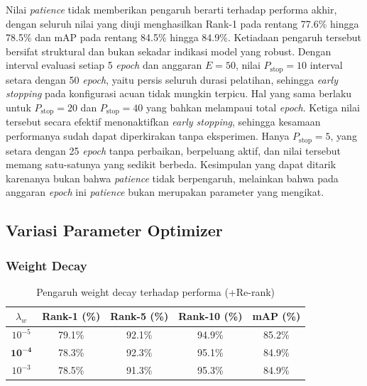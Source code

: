 Nilai \textit{patience} tidak memberikan pengaruh berarti terhadap performa akhir, dengan seluruh nilai yang diuji menghasilkan Rank-1 pada rentang 77.6\% hingga 78.5\% dan mAP pada rentang 84.5\% hingga 84.9\%. Ketiadaan pengaruh tersebut bersifat struktural dan bukan sekadar indikasi model yang robust. Dengan interval evaluasi setiap 5 \textit{epoch} dan anggaran $E=50$, nilai $P_{\text{stop}}=10$ interval setara dengan 50 \textit{epoch}, yaitu persis seluruh durasi pelatihan, sehingga \textit{early stopping} pada konfigurasi acuan tidak mungkin terpicu. Hal yang sama berlaku untuk $P_{\text{stop}}=20$ dan $P_{\text{stop}}=40$ yang bahkan melampaui total \textit{epoch}. Ketiga nilai tersebut secara efektif menonaktifkan \textit{early stopping}, sehingga kesamaan performanya sudah dapat diperkirakan tanpa eksperimen. Hanya $P_{\text{stop}}=5$, yang setara dengan 25 \textit{epoch} tanpa perbaikan, berpeluang aktif, dan nilai tersebut memang satu-satunya yang sedikit berbeda. Kesimpulan yang dapat ditarik karenanya bukan bahwa \textit{patience} tidak berpengaruh, melainkan bahwa pada anggaran \textit{epoch} ini \textit{patience} bukan merupakan parameter yang mengikat.

\subsection{Variasi Parameter Optimizer}

\subsubsection{Weight Decay}

\begin{table}[H]
    \centering
    \caption{Pengaruh weight decay terhadap performa (+Re-rank)}
    \label{tab:var_wd}
    \renewcommand{\arraystretch}{1.25}
    \begin{tabular}{ccccc}
        \hline
        $\lambda_w$        & \textbf{Rank-1 (\%)} & \textbf{Rank-5 (\%)} & \textbf{Rank-10 (\%)} & \textbf{mAP (\%)} \\
        \hline
        $10^{-5}$          & 79.1\%               & 92.1\%               & 94.9\%                & 85.2\%            \\
        $\mathbf{10^{-4}}$ & 78.3\%               & 92.3\%               & 95.1\%                & 84.9\%            \\
        $10^{-3}$          & 78.5\%               & 91.3\%               & 95.3\%                & 84.9\%            \\
        \hline
    \end{tabular}
\end{table}

